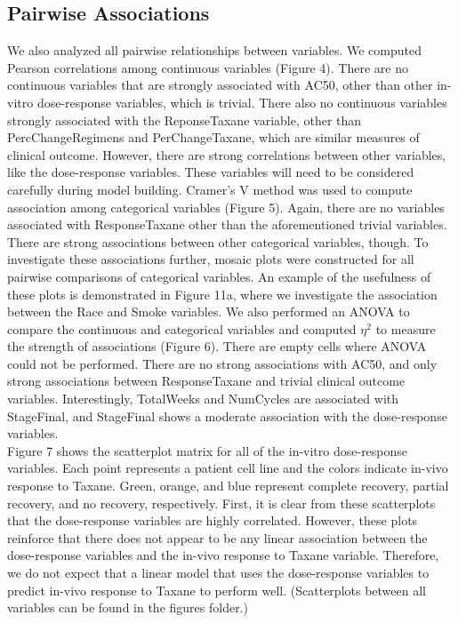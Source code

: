 \documentclass[12pt]{article}
\begin{document}
\subsection{Pairwise Associations}
We also analyzed all pairwise relationships between variables.  We computed Pearson correlations among continuous variables (Figure 4).  There are no continuous variables that are strongly associated with AC50, other than other in-vitro dose-response variables, which is trivial.  There also no continuous variables strongly associated with the ReponseTaxane variable, other than PercChangeRegimens and PerChangeTaxane, which are similar measures of clinical outcome. However, there are strong correlations between other variables, like the dose-response variables.  These variables will need to be considered carefully during model building. Cramer's V method was used to compute association among categorical variables (Figure 5).  Again, there are no variables associated with ResponseTaxane other than the aforementioned trivial variables. There are strong associations between other categorical variables, though.  To investigate these associations further, mosaic plots were constructed for all pairwise comparisons of categorical variables.  An example of the usefulness of these plots is demonstrated in Figure 11a, where we investigate the association between the Race and Smoke variables.  We also performed an ANOVA to compare the continuous and categorical variables and computed $\eta^2$ to measure the strength of associations (Figure 6). There are empty cells where ANOVA could not be performed.  There are no strong associations with AC50, and only strong associations between ResponseTaxane and trivial clinical outcome variables.  Interestingly, TotalWeeks and NumCycles are associated with StageFinal, and StageFinal shows a moderate association with the dose-response variables.\\

Figure 7 shows the scatterplot matrix for all of the in-vitro dose-response variables.  Each point represents a patient cell line and the colors indicate in-vivo response to Taxane. Green, orange, and blue represent complete recovery, partial recovery, and no recovery, respectively.   First, it is clear from these scatterplots that the dose-response variables are highly correlated.  However, these plots reinforce that there does not appear to be any linear association between the dose-response variables and the in-vivo response to Taxane variable.  Therefore, we do not expect that a linear model that uses the dose-response variables to predict in-vivo response to Taxane to perform well.  (Scatterplots between all variables can be found in the figures folder.)
\end{document}
